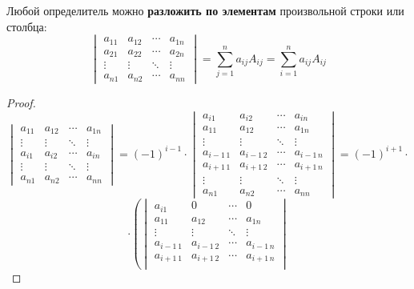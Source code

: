 \begin{theorem}
\label{th:determinant_expansion}
Любой определитель можно \textbf{разложить по элементам} произвольной строки или столбца:
\begin{equation*}
\begin{vmatrix}
a_{11} & a_{12} & \cdots & a_{1n} \\
a_{21} & a_{22} & \cdots & a_{2n} \\
\vdots & \vdots & \ddots & \vdots \\
a_{n1} & a_{n2} & \cdots & a_{nn}
\end{vmatrix} =
\sum_{j=1}^n a_{ij} A_{ij} =
\sum_{i=1}^n a_{ij} A_{ij}
\end{equation*}
\end{theorem}
\begin{proof}
\begin{equation*}
\begin{vmatrix}
a_{11} & a_{12} & \cdots & a_{1n} \\
\vdots & \vdots & \ddots & \vdots \\
a_{i1} & a_{i2} & \cdots & a_{in} \\
\vdots & \vdots & \ddots & \vdots \\
a_{n1} & a_{n2} & \cdots & a_{nn}
\end{vmatrix} =
(-1)^{i-1} \cdot
\begin{vmatrix}
a_{i1} & a_{i2} & \cdots & a_{in} \\
a_{11} & a_{12} & \cdots & a_{1n} \\
\vdots & \vdots & \ddots & \vdots \\
a_{i-1\, 1} & a_{i-1\, 2} & \cdots & a_{i-1\, n} \\
a_{i+1\, 1} & a_{i+1\, 2} & \cdots & a_{i+1\, n} \\
\vdots & \vdots & \ddots & \vdots \\
a_{n1} & a_{n2} & \cdots & a_{nn}
\end{vmatrix} =
(-1)^{i+1} \cdot
\end{equation*}
\begin{equation*}
\cdot \left(
\begin{vmatrix}
a_{i1} & 0 & \cdots & 0 \\
a_{11} & a_{12} & \cdots & a_{1n} \\
\vdots & \vdots & \ddots & \vdots \\
a_{i-1\, 1} & a_{i-1\, 2} & \cdots & a_{i-1\, n} \\
a_{i+1\, 1} & a_{i+1\, 2} & \cdots & a_{i+1\, n} \\

\end{vmatrix}
\end{equation*}
\end{proof}
